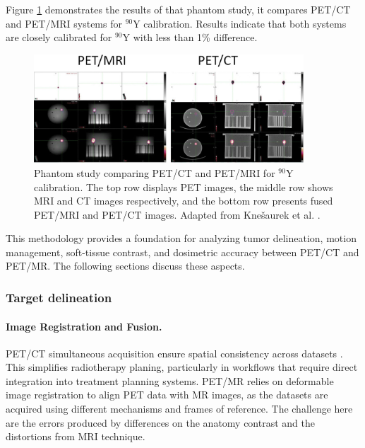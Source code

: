 \documentclass[11pt]{article} %
\begin{document}
\begin{multicols}{2}

Figure \ref{fig:phantom_petct_petmri} demonstrates the results of that phantom study, it compares PET/CT and PET/MRI systems for $^{90}\text{Y}$ calibration. Results indicate that both systems are closely calibrated for \(^{90}\text{Y}\) with less than 1\% difference.

\begin{figure}[ht]
\centering
\includegraphics[width=0.9\textwidth]{assets/PETCT_vs_PETMRI_Phantom.png} %
\caption{Phantom study comparing PET/CT and PET/MRI for \(^{90}\text{Y}\) calibration. The top row displays PET images, the middle row shows MRI and CT images respectively, and the bottom row presents fused PET/MRI and PET/CT images.  Adapted from Knešaurek et al. \cite{knesaurek2018}.}
\label{fig:phantom_petct_petmri}
\end{figure}

This methodology provides a foundation for analyzing tumor delineation, motion management, soft-tissue contrast, and dosimetric accuracy between PET/CT and PET/MR. The following sections discuss these aspects.

\subsubsection{Target delineation}

\paragraph{Image Registration and Fusion.} 

PET/CT simultaneous acquisition ensure spatial consistency across datasets \cite{TG132}. This simplifies radiotherapy planing, particularly in workflows that require direct integration into treatment planning systems. PET/MR relies on deformable image registration to align PET data with MR images, as the datasets are acquired using different mechanisms and frames of reference. The challenge here are the errors produced by differences on the anatomy contrast and the distortions from MRI technique.


\end{multicols}
\end{document}
